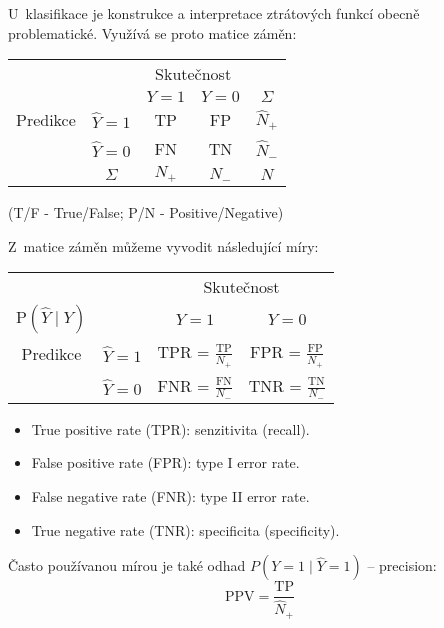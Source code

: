 U~klasifikace je konstrukce a interpretace ztrátových funkcí obecně problematické. Využívá se proto matice záměn:
{\def\arraystretch{1.5}
\begin{center}
    \begin{tabular}{ c c | c c | c }
                 &               & \multicolumn{2}{c|}{Skutečnost}                       \\
                 &               & $Y = 1$                         & $Y=0$ & $\Sigma$    \\
        \hline
        Predikce & $\hat{Y} = 1$ & TP                              & FP    & $\hat{N}_+$ \\
                 & $\hat{Y} = 0$ & FN                              & TN    & $\hat{N}_-$ \\
        \hline
                 & $\Sigma$      & $N_+$                           & $N_-$ & $N$
    \end{tabular}
\end{center}}
(T/F - True/False; P/N - Positive/Negative)

Z~matice záměn můžeme vyvodit následující míry:
{\def\arraystretch{2}
\begin{center}
    \begin{tabular}{ c c | c c }
                                   &               & \multicolumn{2}{c}{Skutečnost}                                 \\
        $\text{P}(\hat{Y} \mid Y)$ &               & $Y = 1$                        & $Y=0$                         \\
        \hline
        Predikce                   & $\hat{Y} = 1$ & TPR = $\frac{\text{TP}}{N_+}$  & FPR = $\frac{\text{FP}}{N_+}$ \\
                                   & $\hat{Y} = 0$ & FNR = $\frac{\text{FN}}{N_-}$  & TNR = $\frac{\text{TN}}{N_-}$ \\
    \end{tabular}
\end{center}}
\begin{itemize}
    \item True positive rate (TPR): senzitivita (recall).
    \item False positive rate (FPR): type I error rate.
    \item False negative rate (FNR): type II error rate.
    \item True negative rate (TNR): specificita (specificity).
\end{itemize}
Často používanou mírou je také odhad ${P(Y = 1 \mid \hat{Y} = 1)}$ -- precision:
\[\text{PPV} = \frac{\text{TP}}{\hat{N}_+}\]

